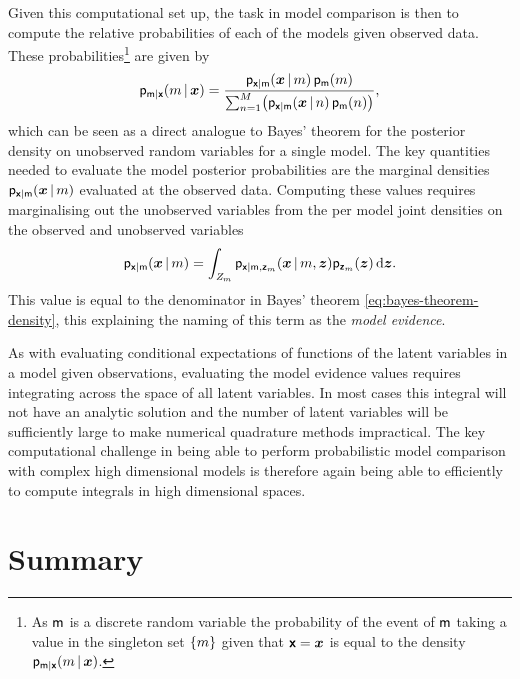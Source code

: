 Given this computational set up, the task in model comparison is then to compute the relative probabilities of each of the models given observed data. These probabilities\footnote{As $\mathsf{m}$ is a discrete random variable the probability of the event of $\mathsf{m}$ taking a value in the singleton set $\fset{m}$ given that $\boldsymbol{\mathsf{x}} = \boldsymbol{x}$ is equal to the density $\mathsf{p}_{\mathsf{m}|\boldsymbol{\mathsf{x}}}(m\operatorname{|}\boldsymbol{x})$.} are given by
\begin{equation}\label{eq:model-posterior}
  \pden{\rvar{m}|\rvct{x}}(m\gvn\vct{x}) = 
  \frac{\pden{\rvct{x}|\rvar{m}}(\vct{x}\gvn m)\,\pden{\rvar{m}}(m)}
  {\sum_{n=1}^M \lpa \pden{\rvct{x}|\rvar{m}}(\vct{x}\gvn n)\,\pden{\rvar{m}}(n)\rpa},
\end{equation}
which can be seen as a direct analogue to Bayes' theorem for the posterior density on unobserved random variables for a single model. The key quantities needed to evaluate the model posterior probabilities are the marginal densities $\mathsf{p}_{\boldsymbol{\mathsf{x}}|\mathsf{m}}(\boldsymbol{x}\operatorname{|} m)$ evaluated at the observed data. Computing these values requires marginalising out the unobserved variables from the per model joint densities on the observed and unobserved variables
\begin{equation}\label{eq:model-marginal-den}
  \mathsf{p}_{\boldsymbol{\mathsf{x}}|\mathsf{m}}(\boldsymbol{x}\operatorname{|} m) = 
  \int_{\mathit{Z}_m} \mathsf{p}_{\boldsymbol{\mathsf{x}}|\mathsf{m},\boldsymbol{\mathsf{z}}_m}(\boldsymbol{x}\operatorname{|} m, \boldsymbol{z}) \mathsf{p}_{\boldsymbol{\mathsf{z}}_m}(\boldsymbol{z})
  \,\mathrm{d}\boldsymbol{z}.
\end{equation}
This value is equal to the denominator in Bayes' theorem \eqref{eq:bayes-theorem-density}, this explaining the naming of this term as the \emph{model evidence}.

As with evaluating conditional expectations of functions of the latent variables in a model given observations, evaluating the model evidence values requires integrating across the space of all latent variables. In most cases this integral will not have an analytic solution and the number of latent variables will be sufficiently large to make numerical quadrature methods impractical. The key computational challenge in being able to perform probabilistic model comparison with complex high dimensional models is therefore again being able to efficiently to compute integrals in high dimensional spaces.

\section{Summary}


